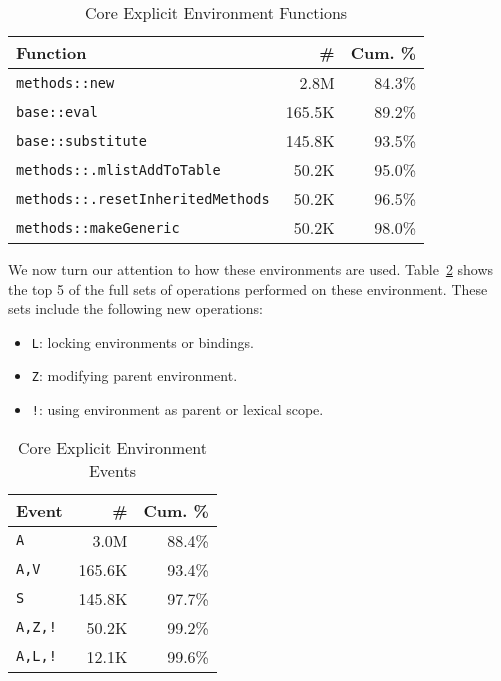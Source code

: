 \documentclass[sigplan,screen]{acmart}
\renewcommand{\c}[1]{\lstinline |#1|\xspace}
\begin{document}
\begin{table}[!h]
  \small
  \caption{Core Explicit Environment Functions} \label{table:core_explicit_fun}
  \centering
  \begin{tabular}{lrr}
    \toprule
    \textbf{Function}&\textbf{\#}&\textbf{Cum. \%}\\
    \midrule
    \c{methods::new}&2.8M&84.3\%\\
    \c{base::eval}&165.5K&89.2\%\\
    \c{base::substitute}&145.8K&93.5\%\\
    \c{methods::.mlistAddToTable}&50.2K&95.0\%\\
    \c{methods::.resetInheritedMethods}&50.2K&96.5\%\\
    \c{methods::makeGeneric}&50.2K&98.0\%\\
    \bottomrule
  \end{tabular}
\end{table}

\noindent
We now turn our attention to how these environments are used.
Table~\ref{table:core_explicit_env_seq} shows the top 5 of the full sets of
operations performed on these environment. These sets include the following new
operations:

\begin{itemize}
\item \texttt{L}: locking environments or bindings.
\item \texttt{Z}: modifying parent environment.
\item \texttt{!}: using environment as parent or lexical scope.
\end{itemize}

\begin{table}[!h]
  \small
  \caption{Core Explicit Environment Events} \label{table:core_explicit_env_seq}
  \centering
  \begin{tabular}{lrr}
    \toprule
    \textbf{Event}&\textbf{\#}&\textbf{Cum. \%}\\
    \midrule
    \texttt{A}&3.0M&88.4\%\\
    \texttt{A,V}&165.6K&93.4\%\\
    \texttt{S}&145.8K&97.7\%\\
    \texttt{A,Z,!}&50.2K&99.2\%\\
    \texttt{A,L,!}&12.1K&99.6\%\\
    \bottomrule
  \end{tabular}
\end{table}
\end{document}
